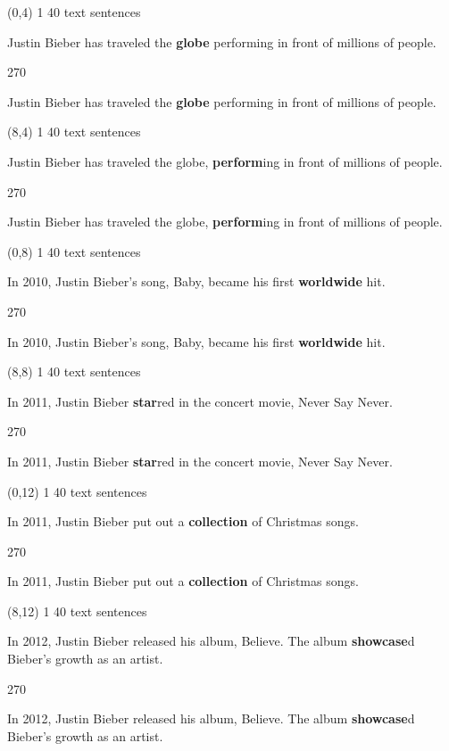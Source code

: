 \documentclass[a4paper]{article}
\newenvironment{itemize*}%
{\begin{itemize}%
 \setlength{\itemsep}{0.5cm}%
 \setlength{\parsep}{0pt}%
 \setlength{\parskip}{0pt}}%
{\end{itemize}}
\newcommand{\mycard}[3]{%
	\small #1 #2
	\par
	\parbox[t][6.8cm][c]{9.5cm}{%
	\par
	\myleft{#3}
	\par
	\myright{#3}
	}
}
\newcommand{\myleft}[1]{%
	\begin{sideways}
	\hspace*{-0.9cm}
		\parbox[t][2.7cm][t]{6.5cm}{%
		\large #1
		}
	\end{sideways}
}
\newcommand{\myright}[1]{%
	\hspace*{6.5cm}
	\begin{turn}{270}
	\hspace*{-7.1cm}
		\parbox[t][2.7cm][t]{6.5cm}{%
		\large #1
		}
	\end{turn}
}
\begin{document}
\begin{textblock}{8}(0,4)
\mycard{1}{40 text sentences}{
\begin{itemize*}
\item Justin Bieber has traveled the \textbf{globe} performing in front of millions of people.
\end{itemize*}
}
\end{textblock}

\begin{textblock}{8}(8,4)
\mycard{1}{40 text sentences}{
\begin{itemize*}
\item Justin Bieber has traveled the globe, \textbf{perform}ing in front of millions of people.
\end{itemize*}
}
\end{textblock}

\begin{textblock}{8}(0,8)
\mycard{1}{40 text sentences}{
\begin{itemize*}
\item In 2010, Justin Bieber's song, Baby, became his first \textbf{worldwide} hit.
\end{itemize*}
}
\end{textblock}

\begin{textblock}{8}(8,8)
\mycard{1}{40 text sentences}{
\begin{itemize*}
\item In 2011, Justin Bieber \textbf{star}red in the concert movie, Never Say Never.
\end{itemize*}
}
\end{textblock}

\begin{textblock}{8}(0,12)
\mycard{1}{40 text sentences}{
\begin{itemize*}
\item In 2011, Justin Bieber put out a \textbf{collection} of Christmas songs.
\end{itemize*}
}
\end{textblock}

\begin{textblock}{8}(8,12)
\mycard{1}{40 text sentences}{
\begin{itemize*}
\item In 2012, Justin Bieber released his album, Believe. The album \textbf{showcase}d Bieber's growth as an artist.
\end{itemize*}
}
\end{textblock}
\end{document}
